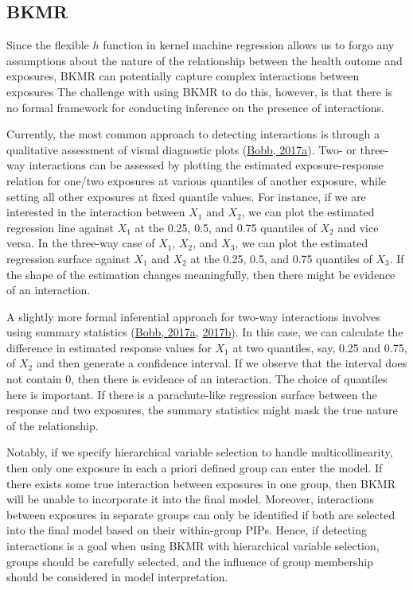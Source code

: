\documentclass[12pt, twoside]{amherstthesis}
\begin{document}
\hypertarget{bkmr-1}{%
\subsection{BKMR}\label{bkmr-1}}

Since the flexible \(h\) function in kernel machine regression allows us to forgo any assumptions about the nature of the relationship between the health outome and exposures, BKMR can potentially capture complex interactions between exposures The challenge with using BKMR to do this, however, is that there is no formal framework for conducting inference on the presence of interactions.

Currently, the most common approach to detecting interactions is through a qualitative assessment of visual diagnostic plots (\protect\hyperlink{ref-bobb_introduction_2017}{Bobb, 2017a}). Two- or three-way interactions can be assessed by plotting the estimated exposure-response relation for one/two exposures at various quantiles of another exposure, while setting all other exposures at fixed quantile values. For instance, if we are interested in the interaction between \(X_1\) and \(X_2\), we can plot the estimated regression line against \(X_1\) at the 0.25, 0.5, and 0.75 quantiles of \(X_2\) and vice versa. In the three-way case of \(X_1\), \(X_2\), and \(X_3\), we can plot the estimated regression surface against \(X_1\) and \(X_2\) at the 0.25, 0.5, and 0.75 quantiles of \(X_3\). If the shape of the estimation changes meaningfully, then there might be evidence of an interaction.

A slightly more formal inferential approach for two-way interactions involves using summary statistics (\protect\hyperlink{ref-bobb_introduction_2017}{Bobb, 2017a}, \protect\hyperlink{ref-bobb_example_2017}{2017b}). In this case, we can calculate the difference in estimated response values for \(X_1\) at two quantiles, say, 0.25 and 0.75, of \(X_2\) and then generate a confidence interval. If we observe that the interval does not contain 0, then there is evidence of an interaction. The choice of quantiles here is important. If there is a parachute-like regression surface between the response and two exposures, the summary statistics might mask the true nature of the relationship.

Notably, if we specify hierarchical variable selection to handle multicollinearity, then only one exposure in each a priori defined group can enter the model. If there exists some true interaction between exposures in one group, then BKMR will be unable to incorporate it into the final model. Moreover, interactions between exposures in separate groups can only be identified if both are selected into the final model based on their within-group PIPs. Hence, if detecting interactions is a goal when using BKMR with hierarchical variable selection, groups should be carefully selected, and the influence of group membership should be considered in model interpretation.
\end{document}

